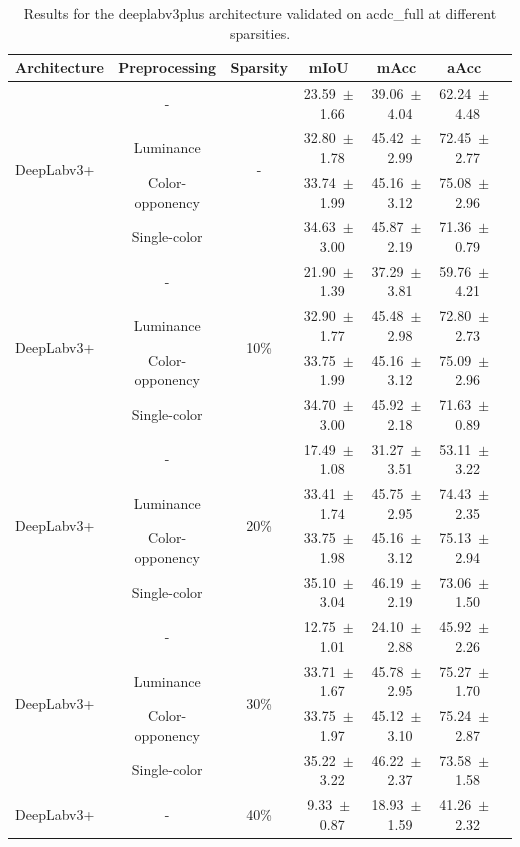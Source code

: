 \begin{table}[h]
\centering
\caption{Results for the deeplabv3plus architecture validated on acdc_full at different sparsities.}
\begin{tabular}{@{}lccc ccc@{}}
\toprule
Architecture & Preprocessing & Sparsity & mIoU & mAcc & aAcc \\
\midrule

\multirow{4}{*}{DeepLabv3+} & - & \multirow{4}{*}{-} & 23.59~$\pm$~1.66 & 39.06~$\pm$~4.04 & 62.24~$\pm$~4.48 \\
& Luminance & & 32.80~$\pm$~1.78 & 45.42~$\pm$~2.99 & 72.45~$\pm$~2.77 \\
& Color-opponency & & 33.74~$\pm$~1.99 & 45.16~$\pm$~3.12 & 75.08~$\pm$~2.96 \\
& Single-color & & 34.63~$\pm$~3.00 & 45.87~$\pm$~2.19 & 71.36~$\pm$~0.79 \\
\midrule
\multirow{4}{*}{DeepLabv3+} & - & \multirow{4}{*}{10\%} & 21.90~$\pm$~1.39 & 37.29~$\pm$~3.81 & 59.76~$\pm$~4.21 \\
& Luminance & & 32.90~$\pm$~1.77 & 45.48~$\pm$~2.98 & 72.80~$\pm$~2.73 \\
& Color-opponency & & 33.75~$\pm$~1.99 & 45.16~$\pm$~3.12 & 75.09~$\pm$~2.96 \\
& Single-color & & 34.70~$\pm$~3.00 & 45.92~$\pm$~2.18 & 71.63~$\pm$~0.89 \\
\midrule
\multirow{4}{*}{DeepLabv3+} & - & \multirow{4}{*}{20\%} & 17.49~$\pm$~1.08 & 31.27~$\pm$~3.51 & 53.11~$\pm$~3.22 \\
& Luminance & & 33.41~$\pm$~1.74 & 45.75~$\pm$~2.95 & 74.43~$\pm$~2.35 \\
& Color-opponency & & 33.75~$\pm$~1.98 & 45.16~$\pm$~3.12 & 75.13~$\pm$~2.94 \\
& Single-color & & 35.10~$\pm$~3.04 & 46.19~$\pm$~2.19 & 73.06~$\pm$~1.50 \\
\midrule
\multirow{4}{*}{DeepLabv3+} & - & \multirow{4}{*}{30\%} & 12.75~$\pm$~1.01 & 24.10~$\pm$~2.88 & 45.92~$\pm$~2.26 \\
& Luminance & & 33.71~$\pm$~1.67 & 45.78~$\pm$~2.95 & 75.27~$\pm$~1.70 \\
& Color-opponency & & 33.75~$\pm$~1.97 & 45.12~$\pm$~3.10 & 75.24~$\pm$~2.87 \\
& Single-color & & 35.22~$\pm$~3.22 & 46.22~$\pm$~2.37 & 73.58~$\pm$~1.58 \\
\midrule
\multirow{4}{*}{DeepLabv3+} & - & \multirow{4}{*}{40\%} & 9.33~$\pm$~0.87 & 18.93~$\pm$~1.59 & 41.26~$\pm$~2.32 \\

\end{tabular}
\end{table}
